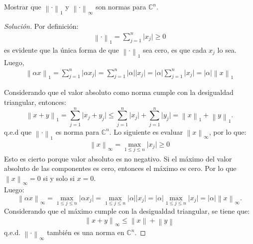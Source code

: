 \documentclass[12pt]{book}
\newcommand{\C}{\mathbb{C}}
\newcommand\norm[1]{\left\lVert#1\right\rVert}
\newenvironment{solucion}
  {\renewcommand\qedsymbol{$\square$}\begin{proof}[Solución]}
  {\end{proof}}
\begin{document}
\eje Mostrar que $\norm{\cdot}_1$ y $\norm{\cdot}_\infty$ son normas para $\C^n$.
\begin{solucion}
Por definición: 
\begin{align*}
    \norm{\cdot}_1=\sum_{j=1}^n\lvert x_j\rvert\geq0    
\end{align*}
es evidente que la única forma de que $\norm{\cdot}_1$ sea cero, es que cada $x_j$ lo sea.\\
Luego, 
\begin{align*}
    \norm{\alpha x}_1=\sum_{j=1}^n\lvert\alpha x_j\rvert=\sum_{j=1}^n\lvert\alpha\rvert\lvert x_j\rvert=\lvert\alpha\rvert\sum_{j=1}^n\lvert x_j\rvert=\lvert\alpha\rvert\norm{x}_1    
\end{align*}

Considerando que el valor absoluto como norma cumple con la desigualdad triangular, entonces:
\[
    \norm{x+y}_1=\sum_{j=1}^n\lvert x_j+y_j\rvert\leq\sum_{j=1}^n\lvert x_j\rvert+\sum_{j=1}^n\lvert y_j\rvert=\norm{x}_1+\norm{y}_1.
\]
q.e.d que $\norm{\cdot}_1$ es norma para $\C^n$. Lo siguiente es evaluar $\norm{x}_\infty$, por lo que:
\begin{align*}
    \norm{x}_\infty=\max_{1\leq j\leq n}\lvert x_j\rvert\geq0    
\end{align*}
Esto es cierto porque valor absoluto es no negativo. Si el máximo del valor absoluto de las componentes es cero, entonces el máximo es cero. Por lo que $\norm{x}_\infty=0$ si y solo si $x=0$.\\
Luego:
\[
    \norm{\alpha x}_\infty=\max_{1\leq j\leq n}\lvert\alpha x_j\rvert=\max_{1\leq j\leq n}\lvert\alpha\rvert\lvert x_j\rvert=\lvert\alpha\rvert\max_{1\leq j\leq n}\lvert x_j\rvert=\lvert\alpha\rvert\norm{x}_\infty.
\]
Considerando que el máximo cumple con la desigualdad triangular, se tiene que: 
\begin{align*}
    \norm{x+y}_\infty\leq\norm{x}+\norm{y}
\end{align*} 
q.e.d. $\norm{\cdot}_\infty$ también es una norma en $\C^n$.
\end{solucion}
\end{document}
